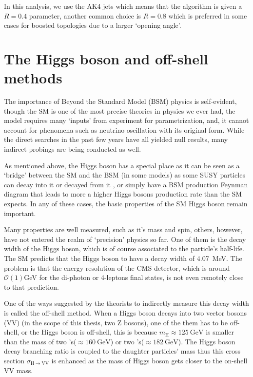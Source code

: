 In this analysis, we use the AK4 jets which means that the algorithm is given a $R=0.4$ parameter, another
common choice is $R=0.8$ which is preferred in some cases for boosted topologies due to a larger `opening
angle'.

\section{The Higgs boson and off-shell methods}\label{sec:physics_offshell}

The importance of Beyond the Standard Model (BSM) physics is self-evident, though the SM is one
of the most precise theories in physics we ever had, the model requires many `inputs' from experiment
for parametrization, and, it cannot account for phenomena such as neutrino oscillation with its
original form. While the direct searches in the past few years have all yielded null results,
many indirect probings are being conducted as well.

As mentioned above, the Higgs boson has a special place as it can be seen as a `bridge' between
the SM and the BSM (in some models) as some SUSY particles can decay into it or decayed from it
, or simply have a BSM production Feynman diagram that leads to more a higher Higgs
bosons production rate than the SM expects. In any of these cases, the basic properties of the SM Higgs
boson remain important.

Many properties are well measured, such as it's mass and spin\cite{cms_higgs}, others, however,
have not entered the realm of `precision' physics so far. One of them is the decay width of
the Higgs boson, which is of course associated to the particle's half-life. The SM predicts
that the Higgs boson to have a decay width of \SI{4.07}{\mega\electronvolt}. The problem is
that the energy resolution of the CMS detector, which is around $\mathcal{O}(1)$\si{\giga\electronvolt}
for the di-photon or 4-leptons final states, is not even remotely close to that prediction.

One of the ways suggested by the theorists\cite{offshell_theory1, offshell_theory2} 
to indirectly measure this decay width is called the
off-shell method. When a Higgs boson decays into two vector bosons (VV) (in the scope of this thesis, two Z bosons),
one of the them has to be off-shell, or the Higgs boson is off-shell, this is because
$m_\text{H}\approx\SI{125}{\giga\electronvolt}$ is smaller than the 
mass of two \PW{}'s($\approx\SI{160}{\giga\electronvolt}$) 
or two \PZ{}'s($\approx\SI{182}{\giga\electronvolt}$). The Higgs boson decay branching ratio
is coupled to the daughter particles' mass thus this cross section
$\sigma_{\mathrm{H}\rightarrow\mathrm{VV}}$ is enhanced as the mass of Higgs boson gets closer to 
the on-shell VV mass.  

